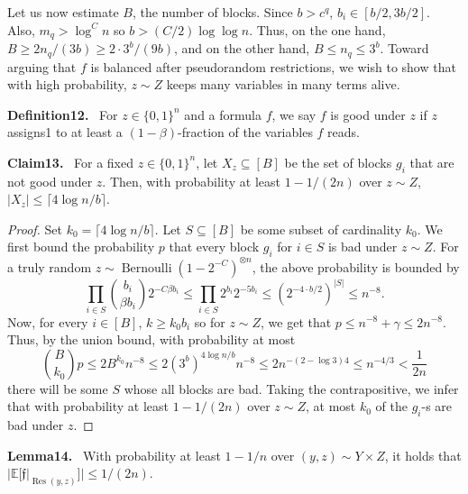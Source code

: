 \documentclass[10pt,a4paper]{article}
\newenvironment{authorclaim}[1]{\par\medskip\noindent\textbf{#1.}\ \ignorespaces}{\par\medskip}
\begin{document}
Let us now estimate $B$, the number of blocks. Since $b>c^q$, $b_i\in[b/2,3b/2]$. Also, $m_q>\log^C n$ so $b>(C/2)\log\log n$. Thus, on the one hand, $B\ge2n_q/(3b)\ge2\cdot3^b/(9b)$, and on the other hand, $B\le n_q\le3^b$.
Toward arguing that $f$ is balanced after pseudorandom restrictions, we wish to show that with high probability, $z\sim Z$ keeps many variables in many terms alive.
\begin{authorclaim}{Definition12}
For $z\in\{0,1\}^n$ and a formula $f$, we say $f$ is good under $z$ if $z$ assigns1 to at least a $(1-\beta)$-fraction of the variables $f$ reads.
\end{authorclaim}
\begin{authorclaim}{Claim13}
For a fixed $z\in\{0,1\}^n$, let $X_z\subseteq[B]$ be the set of blocks $g_i$ that are not good under $z$. Then, with probability at least $1-1/(2n)$ over $z\sim Z$, $|X_z|\le\lceil4\log n/b\rceil$.
\end{authorclaim}
\begin{proof}
Set $k_0=\lceil4\log n/b\rceil$. Let $S\subseteq[B]$ be some subset of cardinality $k_0$. We first bound the probability $p$ that every block $g_i$ for $i\in S$ is bad under $z\sim Z$. For a truly random $z\sim\operatorname{Bernoulli}(1-2^{-C})^{\otimes n}$, the above probability is bounded by
\[
\prod_{i\in S}\binom{b_i}{\beta b_i}2^{-C\beta b_i}
\le\prod_{i\in S}2^{b_i}2^{-5b_i}
\le(2^{-4\cdot b/2})^{|S|}\le n^{-8}.
\]
Now, for every $i\in[B]$, $k\ge k_0b_i$ so for $z\sim Z$, we get that $p\le n^{-8}+\gamma\le2n^{-8}$. Thus, by the union bound, with probability at most
\[
\binom B{k_0}p\le2B^{k_0}n^{-8}
\le2(3^b)^{4\log n/b}n^{-8}
\le2n^{-(2-\log3)4}\le n^{-4/3}<\frac1{2n}
\]
there will be some $S$ whose all blocks are bad. Taking the contrapositive, we infer that with probability at least $1-1/(2n)$ over $z\sim Z$, at most $k_0$ of the $g_i$-s are bad under $z$.
\end{proof}
\begin{authorclaim}{Lemma14}
With probability at least $1-1/n$ over $(y,z)\sim Y\times Z$, it holds that $|\mathbb E[\mathfrak f|_{\operatorname{Res}(y,z)}]|\le1/(2n)$.
\end{authorclaim}
\end{document}
